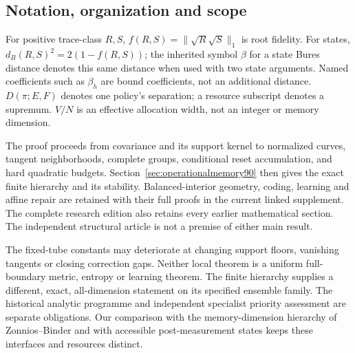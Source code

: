 \subsection{Notation, organization and scope}
For positive trace-class $R,S$, $f(R,S)=\|\sqrt R\sqrt S\|_1$ is root
fidelity.  For states, $d_B(R,S)^2=2(1-f(R,S))$; the inherited symbol
$\beta$ for a state Bures distance denotes this same distance when used
with two state arguments.  Named coefficients such as $\beta_h$ are
bound coefficients, not an additional distance.  $D(\pi;E,F)$ denotes
one policy's separation; a resource subscript denotes a supremum.
$V/N$ is an effective allocation width, not an integer or memory dimension.

The proof proceeds from covariance and its support kernel to normalized
curves, tangent neighborhoods, complete groups, conditional reset
accumulation, and hard quadratic budgets.  Section~\ref{sec:operationalmemory90}
then gives the exact finite hierarchy and its stability.  Balanced-interior
geometry, coding, learning and affine repair are retained with their full
proofs in the current linked supplement.  The complete research edition
also retains every earlier mathematical section.  The independent
structural article is not a premise of either main result.

The fixed-tube constants may deteriorate at changing support floors,
vanishing tangents or closing correction gaps.  Neither local theorem
is a uniform full-boundary metric, entropy or learning theorem.  The
finite hierarchy supplies a different, exact, all-dimension statement on
its specified ensemble family.  The historical analytic programme and
independent specialist priority assessment are separate obligations.
Our comparison with the memory-dimension hierarchy of Zonnios--Binder
\cite{ZB90} and with accessible post-measurement states \cite{EQ90}
keeps these interfaces and resources distinct.
